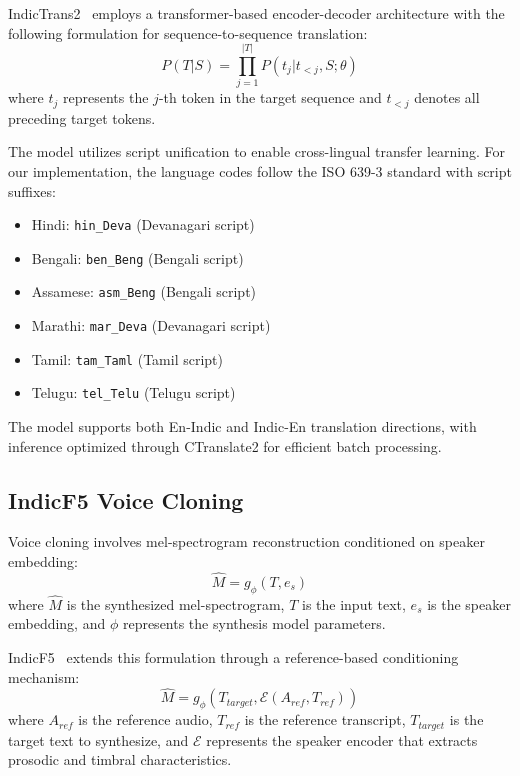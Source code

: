 \documentclass[12pt,oneside]{report}
\begin{document}
IndicTrans2~\cite{gala2023indictrans2} employs a transformer-based encoder-decoder architecture with the following formulation for sequence-to-sequence translation:
\begin{equation}
P(T|S) = \prod_{j=1}^{|T|} P(t_j | t_{<j}, S; \theta)
\end{equation}
where $t_j$ represents the $j$-th token in the target sequence and $t_{<j}$ denotes all preceding target tokens.

The model utilizes script unification to enable cross-lingual transfer learning. For our implementation, the language codes follow the ISO 639-3 standard with script suffixes:
\begin{itemize}
    \item Hindi: \texttt{hin\_Deva} (Devanagari script)
    \item Bengali: \texttt{ben\_Beng} (Bengali script)
    \item Assamese: \texttt{asm\_Beng} (Bengali script)
    \item Marathi: \texttt{mar\_Deva} (Devanagari script)
    \item Tamil: \texttt{tam\_Taml} (Tamil script)
    \item Telugu: \texttt{tel\_Telu} (Telugu script)
\end{itemize}

The model supports both En-Indic and Indic-En translation directions, with inference optimized through CTranslate2 for efficient batch processing.

\subsection{IndicF5 Voice Cloning}
Voice cloning involves mel-spectrogram reconstruction conditioned on speaker embedding:
\begin{equation}
\hat{M} = g_{\phi}(T, e_s)
\end{equation}
where $\hat{M}$ is the synthesized mel-spectrogram, $T$ is the input text, $e_s$ is the speaker embedding, and $\phi$ represents the synthesis model parameters.

IndicF5~\cite{indicf5_2025} extends this formulation through a reference-based conditioning mechanism:
\begin{equation}
\hat{M} = g_{\phi}(T_{target}, \mathcal{E}(A_{ref}, T_{ref}))
\end{equation}
where $A_{ref}$ is the reference audio, $T_{ref}$ is the reference transcript, $T_{target}$ is the target text to synthesize, and $\mathcal{E}$ represents the speaker encoder that extracts prosodic and timbral characteristics.
\end{document}
